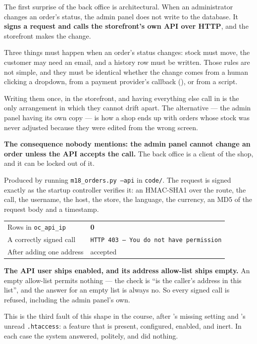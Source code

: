 The first surprise of the back office is architectural. When an administrator
changes an order's status, the admin panel does not write to the database. It
\textbf{signs a request and calls the storefront's own API over HTTP}, and the
storefront makes the change.

\begin{conceptbox}
Three things must happen when an order's status changes: stock must move,
the customer may need an email, and a history row must be written. Those rules
are not simple, and they must be identical whether the change comes from a
human clicking a dropdown, from a payment provider's callback
(), or from a script.

\smallskip
Writing them once, in the storefront, and having everything else call in is
the only arrangement in which they cannot drift apart. The alternative ---
the admin panel having its own copy --- is how a shop ends up with orders
whose stock was never adjusted because they were edited from the wrong screen.

\smallskip
\textbf{The consequence nobody mentions: the admin panel cannot change an order
unless the API accepts the call.} The back office is a client of the shop, and
it can be locked out of it.
\end{conceptbox}

\begin{measured}
Produced by running \texttt{m18\_orders.py --api} in \texttt{code/}. The
request is signed exactly as the startup controller verifies it: an HMAC-SHA1
over
the route, the call, the username, the host, the store, the language, the
currency, an MD5 of the request body and a timestamp.

\smallskip
\begin{tabular}{@{}L{5.6cm}L{8.2cm}@{}}
Rows in \texttt{oc\_api\_ip} & \textbf{0} \\
A correctly signed call & \texttt{HTTP 403 --- You do not have permission} \\
After adding one address & accepted \\
\end{tabular}

\smallskip
\textbf{The API user ships enabled, and its address allow-list ships empty.} An
empty allow-list permits nothing --- the check is ``is the caller's address in
this list'', and the answer for an empty list is always no. So every signed
call is refused, including the admin panel's own.

\smallskip
This is the third fault of this shape in the course, after 's
missing setting and 's unread \texttt{.htaccess}: a feature
that is present, configured, enabled, and inert. In each case the system
answered, politely, and did nothing.
\end{measured}

